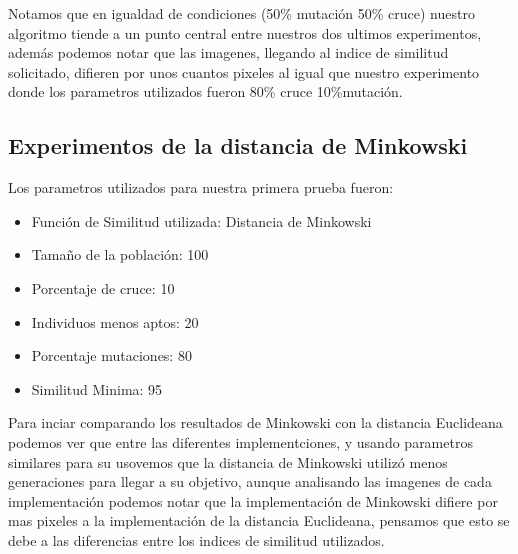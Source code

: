 \documentclass[conference]{C:/Program Files (x86)/MiKTeX 2.9/tex/latex/ltxmisc/IEEEtran}
\begin{document}
Notamos que en igualdad de condiciones (50\% mutación 50\% cruce) nuestro algoritmo tiende a un punto central entre nuestros dos ultimos experimentos, además podemos notar que las imagenes, llegando al indice de similitud solicitado, difieren por unos cuantos pixeles al igual que nuestro experimento donde los parametros utilizados fueron 80\% cruce 10\%mutación.

\subsection{Experimentos de la distancia de Minkowski}
\par
Los parametros utilizados para nuestra primera prueba fueron:
\begin{itemize}
	\item Función de Similitud utilizada: Distancia de Minkowski
	\item Tamaño de la población: 100
	\item Porcentaje de cruce: 10
	\item Individuos menos aptos: 20
	\item Porcentaje mutaciones: 80
	\item Similitud Minima: 95
\end{itemize}
Para inciar comparando los resultados de Minkowski con la distancia Euclideana podemos ver que entre las diferentes implementciones, y usando parametros similares para su usovemos que la distancia de Minkowski utilizó menos generaciones para llegar a su objetivo, aunque analisando las imagenes de cada implementación podemos notar que la implementación de Minkowski difiere por mas pixeles a la implementación de la distancia Euclideana, pensamos que esto se debe a las diferencias entre los indices de similitud utilizados.
\end{document}
